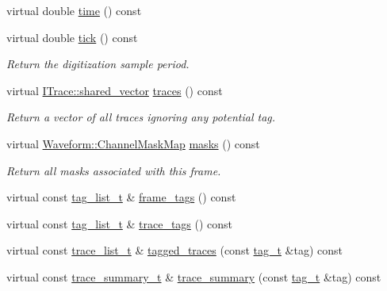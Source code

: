 \begin{DoxyCompactItemize}
virtual double \hyperlink{class_wire_cell_1_1_simple_frame_a992d807e8f20c9481deb419496b9de91}{time} () const
\item 
virtual double \hyperlink{class_wire_cell_1_1_simple_frame_a14d84465625254f1b0086cef1d0bb5cd}{tick} () const
\begin{DoxyCompactList}\small\item\em Return the digitization sample period. \end{DoxyCompactList}\item 
virtual \hyperlink{class_wire_cell_1_1_i_data_a6edac35e7dd886018740993b28c7ca1e}{I\+Trace\+::shared\+\_\+vector} \hyperlink{class_wire_cell_1_1_simple_frame_aec2f4f732121b801887077c874cb8b98}{traces} () const
\begin{DoxyCompactList}\small\item\em Return a vector of all traces ignoring any potential tag. \end{DoxyCompactList}\item 
virtual \hyperlink{namespace_wire_cell_1_1_waveform_a18b9ae61c858e340252ba3ac83ac3bc0}{Waveform\+::\+Channel\+Mask\+Map} \hyperlink{class_wire_cell_1_1_simple_frame_a9261256f0f814b50120d6eabe2a13f0d}{masks} () const
\begin{DoxyCompactList}\small\item\em Return all masks associated with this frame. \end{DoxyCompactList}\item 
virtual const \hyperlink{class_wire_cell_1_1_i_frame_ab34485d40e352997c21b9ec99504ba7c}{tag\+\_\+list\+\_\+t} \& \hyperlink{class_wire_cell_1_1_simple_frame_ac52a4eab51683ef1b5bf746da3dcaec5}{frame\+\_\+tags} () const
\item 
virtual const \hyperlink{class_wire_cell_1_1_i_frame_ab34485d40e352997c21b9ec99504ba7c}{tag\+\_\+list\+\_\+t} \& \hyperlink{class_wire_cell_1_1_simple_frame_af174d058e161ae60dd374deea25c725c}{trace\+\_\+tags} () const
\item 
virtual const \hyperlink{class_wire_cell_1_1_i_frame_a12f08adf79d21cb9b4862a16193fda8f}{trace\+\_\+list\+\_\+t} \& \hyperlink{class_wire_cell_1_1_simple_frame_a141502ebb9e7b55be68073b9782cb17d}{tagged\+\_\+traces} (const \hyperlink{class_wire_cell_1_1_i_frame_ae206ba618e10f398625dfeb675a4215a}{tag\+\_\+t} \&tag) const
\item 
virtual const \hyperlink{class_wire_cell_1_1_i_frame_ad65f8b090c2607591e44d7b40777517e}{trace\+\_\+summary\+\_\+t} \& \hyperlink{class_wire_cell_1_1_simple_frame_a3e564b456f19fa5f3afe7639c74ffb00}{trace\+\_\+summary} (const \hyperlink{class_wire_cell_1_1_i_frame_ae206ba618e10f398625dfeb675a4215a}{tag\+\_\+t} \&tag) const

\end{DoxyCompactItemize}
